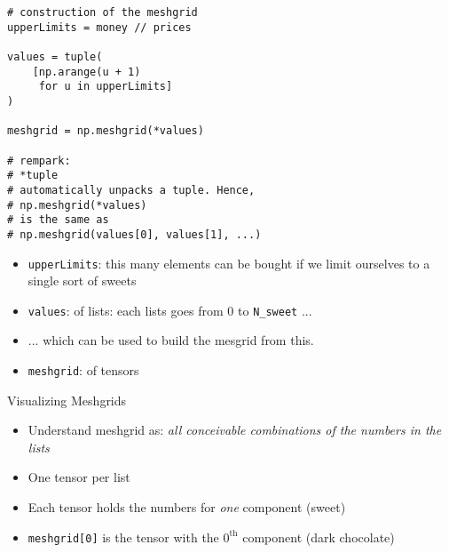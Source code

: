 
\begin{frame}[fragile]
%
\begin{tcbraster}[raster columns=2,
                  raster equal height,
                  nobeforeafter,
                  raster column skip=0.2cm]
\begin{codebox}
\begin{verbatim}
# construction of the meshgrid
upperLimits = money // prices

values = tuple(
    [np.arange(u + 1) 
     for u in upperLimits]
)

meshgrid = np.meshgrid(*values)

# rempark: 
# *tuple
# automatically unpacks a tuple. Hence,
# np.meshgrid(*values)
# is the same as
# np.meshgrid(values[0], values[1], ...)
\end{verbatim}
\end{codebox}
%
\begin{tcolorbox}[title=Elements in Code]
\begin{itemize}
\item \texttt{upperLimits}: this many elements can be bought if we limit ourselves to a single sort of sweets
\item \texttt{values}:  of lists: each lists goes from 0 to \texttt{N\_sweet} ...
\item ... which can be used to build the mesgrid from this.
\item \texttt{meshgrid}:  of tensors
\end{itemize}
\end{tcolorbox}
\end{tcbraster}
%
\end{frame}


\begin{frame}{Visualizing Meshgrids}
%
\begin{itemize}
\item Understand meshgrid as: \emph{all conceivable combinations of the numbers in the lists}
\item One tensor per list
\item Each tensor holds the numbers for \emph{one} component (\ie sweet)
\item \texttt{meshgrid[0]} is the tensor with the $0^{\text{th}}$ component (\ie dark chocolate)
\end{itemize}
%
\end{frame}

